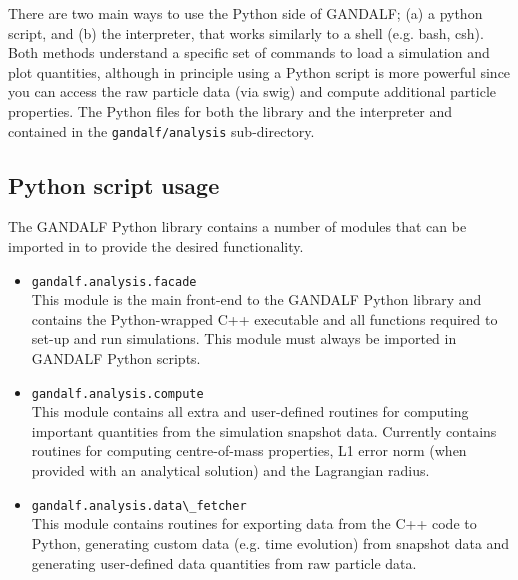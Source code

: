 \documentclass[a4paper]{article}
\newcommand{\var}[1]{\texttt{#1}}
\begin{document}
There are two main ways to use the Python side of GANDALF; (a) a python script, and  (b) the interpreter, that works similarly to a shell (e.g. bash, csh).  Both methods understand a specific set of commands to load a simulation and plot quantities, although in principle using a Python script is more powerful %
since you can access the raw particle data (via swig) and compute additional particle properties.  The Python files for both the library and the interpreter and contained in the \var{gandalf/analysis} sub-directory.



\subsection{Python script usage}
The GANDALF Python library contains a number of modules that can be imported in to provide the desired functionality.
\begin{itemize}
\item \lstinline[columns=fixed]{gandalf.analysis.facade} \\
\noindent This module is the main front-end to the GANDALF Python library and contains the Python-wrapped C++ executable and all functions required to set-up and run simulations.  This module must always be imported in GANDALF Python scripts.
\item \lstinline{gandalf.analysis.compute} \\
\noindent This module contains all extra and user-defined routines for computing important quantities from the simulation snapshot data.  Currently contains routines for computing centre-of-mass properties, L1 error norm (when provided with an analytical solution) and the Lagrangian radius.
\item \lstinline{gandalf.analysis.data\_fetcher} \\
This module contains routines for exporting data from the C++ code to Python, generating custom data (e.g. time evolution) from snapshot data and generating user-defined data quantities from raw particle data.
\end{itemize}
\end{document}
